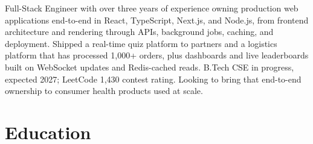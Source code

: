 \documentclass[11pt,a4paper,sans]{moderncv}
\begin{document}
\makecvtitle


\vspace{4pt}
\small{Full-Stack Engineer with over three years of experience owning production web applications end-to-end in React, TypeScript, Next.js, and Node.js, from frontend architecture and rendering through APIs, background jobs, caching, and deployment. Shipped a real-time quiz platform to partners and a logistics platform that has processed 1,000+ orders, plus dashboards and live leaderboards built on WebSocket updates and Redis-cached reads. B.Tech CSE in progress, expected 2027; LeetCode 1,430 contest rating. Looking to bring that end-to-end ownership to consumer health products used at scale.}


\section{Education}
\vspace{1pt}

\end{document}
